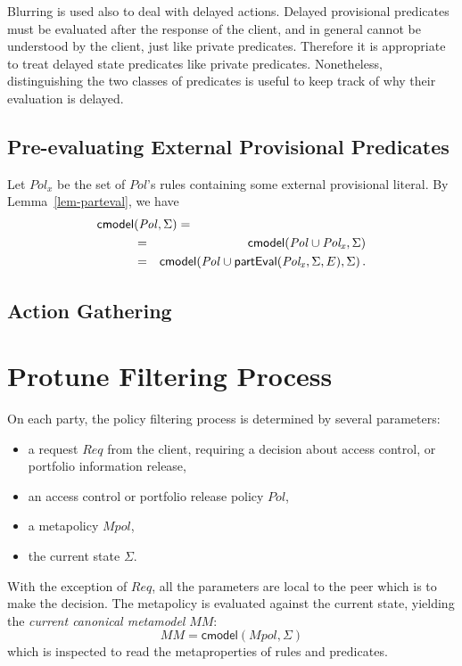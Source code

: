 \documentclass{article}
\newcommand{\m}[1]{\ensuremath{\mathsf{#1}}}
\newcommand{\x}[1]{\ensuremath{\mathit{#1}}}
\begin{document}
Blurring is used also to deal with delayed actions.  Delayed
provisional predicates must be evaluated after the response of the
client, and in general cannot be understood by the client, just like
private predicates.  Therefore it is appropriate to treat delayed
state predicates like private predicates.  Nonetheless, distinguishing
the two classes of predicates is useful to keep track of why their
evaluation is delayed.

        \subsection{Pre-evaluating External Provisional Predicates}


Let \x{Pol_x} be the set of \x{Pol}'s rules containing some external
provisional literal.  By Lemma~\ref{lem-parteval}, we have
\begin{eqnarray*}
\m{cmodel} \lefteqn{ (\x{Pol},\Sigma) = } \\
 & = &   \m{cmodel}(\x{Pol \cup Pol_x},\Sigma) \\
 & = &   \m{cmodel}(\x{Pol} \cup \m{partEval}(\x{Pol_x},\Sigma,E),\Sigma) \,.  
\end{eqnarray*}

\subsection{Action Gathering}




\section{Protune Filtering Process}

On each party, the policy filtering process is determined by several
parameters:
\begin{itemize}
\item  a request \x{Req} from the client, requiring a decision about
access control, or portfolio information release,
\item an access control or portfolio release policy \x{Pol},
\item a metapolicy \x{Mpol},
\item the current state $\Sigma$.
\end{itemize}
With the exception of \x{Req}, all the parameters are local to the
peer which is to make the decision.  The metapolicy is evaluated
against the current state, yielding the \emph{current canonical
metamodel} \x{MM}:
\[
        \x{MM} = \m{cmodel}(\x{Mpol},\Sigma)
\]
which is inspected to read the metaproperties of rules and predicates.
\end{document}
